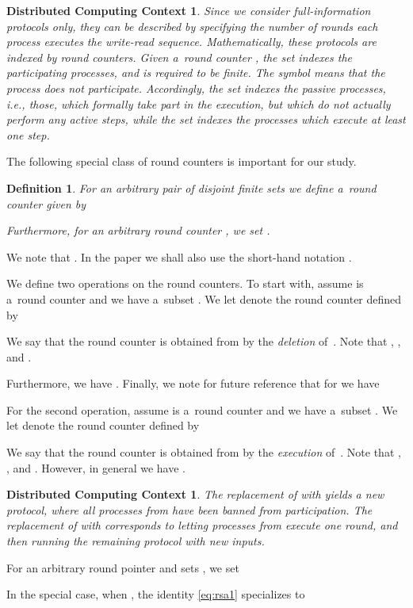 \documentclass{amsart}[10pt]
\newtheorem{df}[theorem]{Definition}
\newtheorem{dcc}[theorem]{Distributed Computing Context}
\newcommand{\pnt}{round counter }
\numberwithin{equation}{section}
\numberwithin{figure}{section}
\numberwithin{table}{section}
\begin{document}
\begin{dcc}
Since we consider full-information protocols only, they can be
described by specifying the number of rounds each process executes the
write-read sequence. Mathematically, these protocols are indexed by
round counters. Given a~round counter , the set 
indexes the participating processes, and is required to be finite. The
symbol  means that the process does not participate.
Accordingly, the set  indexes the passive processes, i.e.,
those, which formally take part in the execution, but which do not
actually perform any active steps, while the set  indexes the
processes which execute at least one step.
\end{dcc}

The following special class of round counters is important for our
study.

\begin{df}
For an arbitrary pair of disjoint finite sets 
we define a~round counter  given by


Furthermore, for an arbitrary round counter , we set
.
\end{df}

We note that . In the paper we shall also
use the short-hand notation .

We define two operations on the round counters. To start with, assume
 is a~\pnt and we have a~subset . We let
 denote the \pnt defined by

We say that the \pnt  is obtained from  by the {\it
  deletion} of~. Note that ,
, and . 

Furthermore, we have . Finally, we note for future reference that for
 we have
 

For the second operation, assume  is a~\pnt and we have a~subset
. We let  denote the \pnt defined by

We say that the \pnt  is obtained from  by the {\it
  execution} of~. Note that ,
, and .
However, in general we have .

\begin{dcc} 
The replacement of  with  yields a new protocol, where
all processes from  have been banned from participation. The
replacement of  with  corresponds to letting processes
from  execute one round, and then running the remaining protocol
with new inputs.
\end{dcc}

For an arbitrary round pointer  and sets ,
 we set

In the special case, when , the identity \eqref{eq:rsa1}
specializes to
\end{document}
